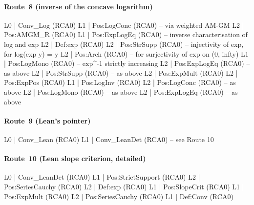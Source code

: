 \documentclass[11pt,reqno]{amsart}
\theoremstyle{redplain}
\numberwithin{equation}{section}
\begin{document}
\paragraph{Route~8 (inverse of the concave logarithm)}

\begin{verbatimbox}
	L0 | Conv_Log                           (RCA0)
	L1 |   Pos:LogConc                      (RCA0)  -- via weighted AM-GM
	L2 |     Pos:AMGM_R                     (RCA0)
	L1 |   Pos:ExpLogEq                     (RCA0)  -- inverse characterisation of log and exp
	L2 |     Def:exp                        (RCA0)
	L2 |     Pos:StrSupp                    (RCA0)  -- injectivity of exp, for log(exp y) = y
	L2 |     Pos:Arch                       (RCA0)  -- for surjectivity of exp on (0, infty)
	L1 |   Pos:LogMono                      (RCA0)  -- exp^{-1} strictly increasing
	L2 |     Pos:ExpLogEq                   (RCA0)  -- as above
	L2 |     Pos:StrSupp                    (RCA0)  -- as above
	L2 |     Pos:ExpMult                    (RCA0)
	L2 |     Pos:ExpPos                     (RCA0)
	L1 |   Pos:LogInv                       (RCA0)
	L2 |     Pos:LogConc                    (RCA0)  -- as above
	L2 |     Pos:LogMono                    (RCA0)  -- as above
	L2 |     Pos:ExpLogEq                   (RCA0)  -- as above
\end{verbatimbox}

\paragraph{Route~9 (Lean's pointer)}

\begin{verbatimbox}
	L0 | Conv_Lean                          (RCA0)
	L1 |   Conv_LeanDet                     (RCA0)  -- see Route 10
\end{verbatimbox}

\paragraph{Route~10 (Lean slope criterion, detailed)}

\begin{verbatimbox}
	L0 | Conv_LeanDet                       (RCA0)
	L1 |   Pos:StrictSupport                (RCA0)
	L2 |     Pos:SeriesCauchy               (RCA0)
	L2 |     Def:exp                        (RCA0)
	L1 |   Pos:SlopeCrit                    (RCA0)
	L1 |   Pos:ExpMult                      (RCA0)
	L2 |     Pos:SeriesCauchy               (RCA0)
	L1 |   Def:Conv                         (RCA0)
\end{verbatimbox}
\end{document}
